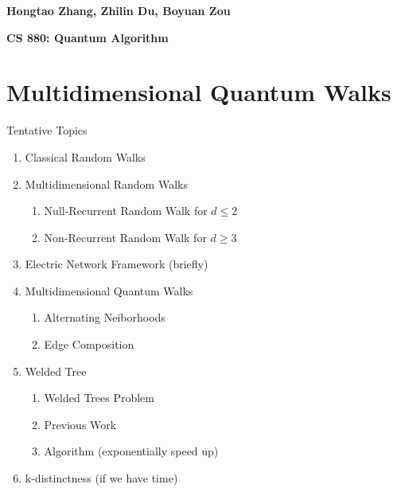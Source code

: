 \documentclass{article}%
\begin{document}
\begin{flushright}
    \textbf{Hongtao Zhang, Zhilin Du, Boyuan Zou \\}
\end{flushright}

\begin{center}
    \textbf{CS 880: Quantum Algorithm} \\
\end{center}

\section{Multidimensional Quantum Walks}

Tentative Topics

\begin{enumerate}
    \item Classical Random Walks
    \item Multidimensional Random Walks \cite[p.~295-299]{durrett2019probability}
          \begin{enumerate}
              \item Null-Recurrent Random Walk for $d\leqslant 2$
              \item Non-Recurrent Random Walk for $d\geqslant 3$
          \end{enumerate}
    \item Electric Network Framework \cite[p.~17]{jeffery2022multidimensional} \cite{belovs2013quantum} (briefly)
    \item Multidimensional Quantum Walks \cite[p.~]{jeffery2022multidimensional}
          \begin{enumerate}
              \item Alternating Neiborhoods
              \item Edge Composition
          \end{enumerate}
    \item Welded Tree \cite{jeffery2022multidimensional}
          \begin{enumerate}
              \item Welded Trees Problem
              \item Previous Work \cite{Childs_2003}
              \item Algorithm (exponentially speed up)
          \end{enumerate}
    \item k-distinctness \cite{jeffery2022multidimensional} (if we have time)
\end{enumerate}
\end{document}

